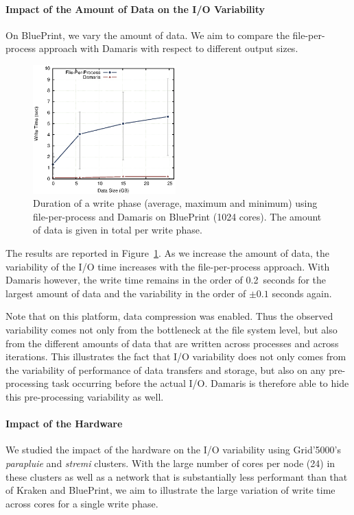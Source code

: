 \paragraph{Impact of the Amount of Data on the I/O Variability}
On BluePrint, we vary the amount of data. We aim to compare the file-per-process approach with Damaris
with respect to different output sizes.
%
\begin{figure}
	\includegraphics[width=5.5cm]{figures/blueprint-write-time.eps}
	\caption[Write time of CM1 on BluePrint]{Duration of a write phase (average, maximum and minimum) 
	using file-per-process and Damaris on BluePrint (1024 cores). 
	The amount of data is given in total per write phase.}
	\label{fig:blueprint_write_time}
\end{figure}
%
The results are reported in Figure~\ref{fig:blueprint_write_time}.
As we increase the amount of data, the variability
of the I/O time increases with the file-per-process approach. With Damaris however, the 
write time remains in the order of 0.2~seconds for the largest amount of data and 
the variability in the order of $\pm 0.1$ seconds again.

Note that on this platform, data compression was enabled. Thus the observed variability
comes not only from the bottleneck at the file system level, but also from the
different amounts of data that are written across processes and across iterations.
This illustrates the fact that I/O variability does not only comes from the variability of
performance of data transfers and storage, but also on any pre-processing task occurring 
before the actual I/O. Damaris is therefore able to hide this pre-processing variability as well.

\paragraph{Impact of the Hardware}
We studied the impact of the hardware on the I/O variability using Grid'5000's \emph{parapluie}
and \emph{stremi} clusters.
With the large number of cores per node (24) in these clusters as well as a network that is 
substantially less performant than that of Kraken and BluePrint, we aim to illustrate the 
large variation of write time across cores for a single write phase.

